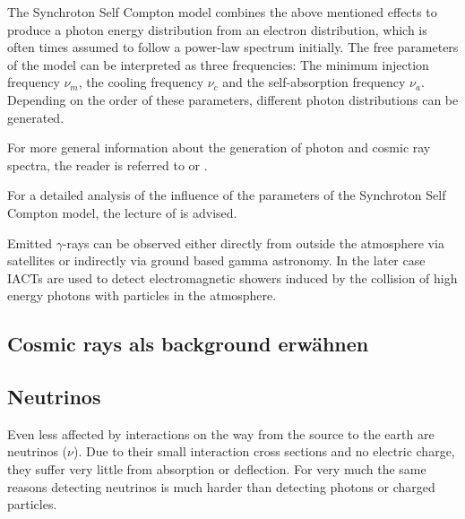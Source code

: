 The Synchroton Self Compton model combines the above mentioned
effects to produce a photon energy distribution from an
electron distribution, which is often times assumed to
follow a power-law spectrum initially.
The free parameters of the model can be interpreted as 
three frequencies: The minimum injection frequency $\nu_m$, 
the cooling frequency $\nu_c$ and the self-absorption frequency $\nu_a$.
Depending on the order of these parameters, different 
photon distributions can be generated.

For more general information about the generation of photon 
and cosmic ray spectra, the reader is referred to 
\cite{gaisser_engel_resconi_2016}
or
\cite{bookap}.

For a detailed analysis of the influence of the parameters of
the Synchroton Self Compton model, 
the lecture of \cite{10.1093/mnras/stt1461} is advised.


Emitted $\gamma$-rays can be observed either directly
from outside the atmosphere via satellites or indirectly
via ground based gamma astronomy. In the later case
IACTs are used to detect electromagnetic showers induced
by the collision of high energy photons with particles in the atmosphere.

\subsection{Cosmic rays als background erwähnen}


\iffalse
\subsection{Neutrinos}
Even less affected by interactions on the way 
from the source to the earth are neutrinos ($\nu$).
Due to their small interaction cross sections and no electric charge, they 
suffer very little from absorption or deflection.
For very much the same reasons detecting neutrinos is much harder
than detecting photons or charged particles.


